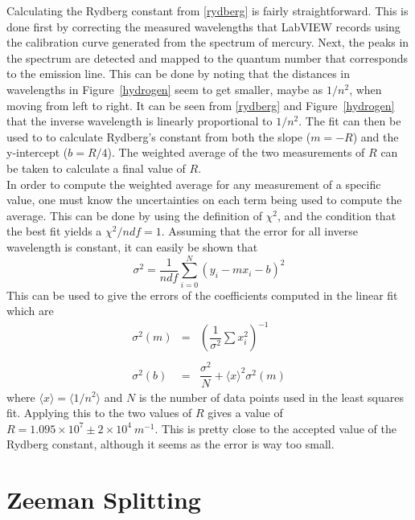 \documentclass[11pt,letterpaper]{article}
\begin{document}
Calculating the Rydberg constant from \eqref{rydberg} is fairly straightforward.
This is done first by correcting the measured wavelengths that LabVIEW records
using the calibration curve generated from the spectrum of mercury. Next, the
peaks in the spectrum are detected and mapped to the quantum number that
corresponds to the emission line. This can be done by noting that the distances
in wavelengths in Figure~\ref{hydrogen} seem to get smaller, maybe as $1/n^2$,
when moving from left to right. It can be seen from \eqref{rydberg}  and
Figure~\ref{hydrogen} that the inverse wavelength is linearly proportional to
$1 / n^2$. The fit can then be used to to calculate Rydberg's constant from both
the slope ($m = -R$) and the y-intercept ($b = R/4$). The weighted average of
the two measurements of $R$ can be taken to calculate a final value of $R$. \\

In order to compute the weighted average for any measurement of a specific
value, one must know the uncertainties on each term being used to compute the
average. This can be done by using the definition of $\chi^2$, and the
condition that the best fit yields a $\chi^2 / ndf = 1$. Assuming that the error
for all inverse wavelength is constant, it can easily be shown that
\begin{equation}
    \sigma^2 = \frac{1}{ndf} \sum_{i=0}^N \left(y_i - m x_i - b\right)^2
\end{equation}
This can be used to give the errors of the coefficients computed in the linear
fit which are \cite{LyonsError}
\begin{equation}
    \begin{array}{lcr}
        \sigma^2\left(m\right) & = & 
        \left(\dfrac{1}{\sigma^2}\sum x_i^2 \right)^{-1} \\
        \ \\
        \sigma^2\left(b\right) & = & \dfrac{\sigma^2}{N} + \langle x \rangle^2
            \sigma^2\left(m\right)
    \end{array}
    \label{coeferr}
\end{equation}
where $\langle x \rangle = \langle 1 / n^2 \rangle$ and $N$ is the number of
data points used in the least squares fit. Applying this to the two values of
$R$ gives a value of $R = 1.095 \times 10^7 \pm 2 \times 10^4\ m^{-1}$. This is
pretty close to the accepted value of the Rydberg constant, although it seems as
the error is way too small.

\section{Zeeman Splitting}
\end{document}
